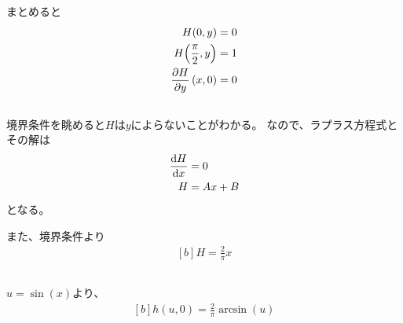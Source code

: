\documentclass[../ap_2016.tex]{subfiles}
\begin{document}
まとめると
\begin{equation}\begin{aligned}[b]
    H(0,y) &= 0\\
    H\qty(\frac{\pi}{2},y) &= 1\\
    \pdv{H}{y}\,(x,0) &=0
\end{aligned}\end{equation}

\subsection{}
境界条件を眺めると\(H\)は\(y\)によらないことがわかる。
なので、ラプラス方程式とその解は
\begin{equation}\begin{aligned}[b]
    \dv{H}{x}&=0\\
    H&= Ax +B
\end{aligned}\end{equation}
となる。

また、境界条件より
\begin{equation}\begin{aligned}[b]
    H = \frac{2}{\pi}x
\end{aligned}\end{equation}

\subsection{}
\(u=\sin(x)\)より、
\begin{equation}\begin{aligned}[b]
    h(u,0)=\frac{2}{\pi}\arcsin(u)
\end{aligned}\end{equation}
\end{document}
